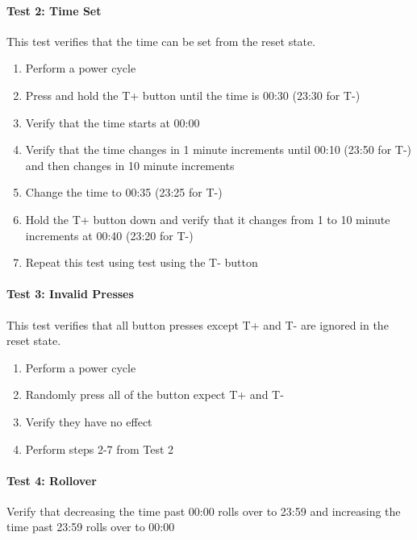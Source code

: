 \documentclass{article}
\begin{document}
\paragraph{Test 2: Time Set} This test verifies that the time can be set from the reset state.
\begin{enumerate}
    \item Perform a power cycle
    \item Press and hold the T+ button until the time is 00:30 (23:30 for T-)
    \item Verify that the time starts at 00:00
    \item Verify that the time changes in 1 minute increments until 00:10 (23:50 for T-) and then changes in 10 minute increments
    \item Change the time to 00:35 (23:25 for T-)
    \item Hold the T+ button down and verify that it changes from 1 to 10 minute increments at 00:40 (23:20 for T-)
    \item Repeat this test using test using the T- button
\end{enumerate}


\paragraph{Test 3: Invalid Presses} This test verifies that all button presses except T+ and T- are ignored in the reset state.
\begin{enumerate}
    \item Perform a power cycle
    \item Randomly press all of the button expect T+ and T-
    \item Verify they have no effect
    \item Perform steps 2-7 from Test 2
\end{enumerate}


\paragraph{Test 4: Rollover} Verify that decreasing the time past 00:00 rolls over to 23:59 and increasing the time past 23:59 rolls over to 00:00
\end{document}
